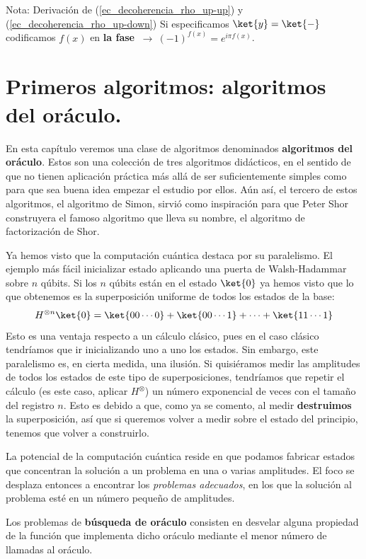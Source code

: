\documentclass[a4paper,11pt]{book} %
\numberwithin{equation}{chapter}
\begin{document}
\begin{mybox_blue}{Nota: Derivación de (\ref{ec_decoherencia_rho_up-up}) y  (\ref{ec_decoherencia_rho_up-down})}
Si especificamos $\ket{y} = \ket{-}$ codificamos $f(x)$ en \textbf{la fase} $~\to ~(-1)^{f(x)} = e^{i\pi f(x)}$.




\chapter{Primeros algoritmos: algoritmos del oráculo.}

En esta capítulo veremos una clase de algoritmos denominados \textbf{algoritmos del oráculo}. Estos son una colección de tres algoritmos didácticos, en el sentido de que no tienen aplicación práctica más allá de ser suficientemente simples como para que sea buena idea empezar el estudio por ellos. Aún así, el tercero de estos algoritmos, el algoritmo de Simon, sirvió como inspiración para que Peter Shor construyera el famoso algoritmo que lleva su nombre, el algoritmo de factorización de Shor.

Ya hemos visto que la computación cuántica destaca por su paralelismo. El ejemplo más fácil inicializar estado aplicando una puerta de Walsh-Hadammar sobre $n$ qúbits. Si los $n$ qúbits están en el estado $\ket{0}$ ya hemos visto que lo que obtenemos es la superposición uniforme de todos los estados de la base:
	\begin{equation}
	H^{\otimes n} \ket{0} = \ket{00\cdots0} + \ket{00\cdots1} + \cdots + \ket{11\cdots 1}
	\end{equation}
Esto es una ventaja respecto a un cálculo clásico, pues en el caso clásico tendríamos que ir inicializando uno a uno los estados. Sin embargo, este paralelismo es, en cierta medida, una ilusión.  Si quisiéramos medir las amplitudes de todos los estados de este tipo de superposiciones, tendríamos que repetir el cálculo (es este caso, aplicar $H^{\otimes}$) un número exponencial de veces con el tamaño del registro $n$. Esto es debido a que, como ya se comento, al medir \textbf{destruimos} la superposición, así que si queremos volver a medir sobre el estado del principio, tenemos que volver a construirlo. 

La potencial de la computación cuántica reside en que podamos fabricar estados que concentran la solución a un problema en una o varias amplitudes. El foco se desplaza entonces a encontrar los \textit{problemas adecuados}, en los que la solución al problema esté en un número pequeño de amplitudes. 

Los problemas de \textbf{búsqueda de oráculo} consisten en desvelar alguna propiedad de la función que implementa dicho oráculo mediante el menor número de llamadas al oráculo. 


\end{mybox_blue}
\end{document}
